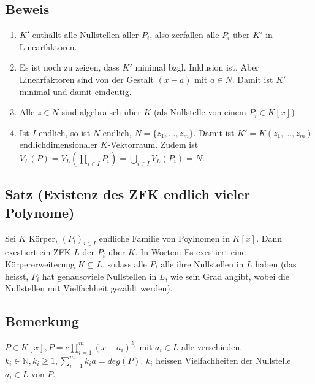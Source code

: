 \documentclass[12pt,a4paper,ngerman]{scrreprt}
\begin{document}
\subsection{Beweis}
\begin{enumerate}[(1)]
\item $K'$ enthällt alle Nullstellen aller $P_i$, also zerfallen alle $P_i$ über $K'$ in Linearfaktoren.
\item Es ist noch zu zeigen, dass $K'$ minimal bzgl. Inklusion ist. 
Aber Linearfaktoren sind von der Gestalt $(x-a)$ mit $a \in N$.
Damit ist $K'$ minimal und damit eindeutig.
\item Alle $z \in N$ sind algebraisch über $K$ (als Nullstelle von einem $P_i \in K[x]$)
\item Ist $I$ endlich, so ist $N$ endlich, $N = \{ z_1, ..., z_m\}$.
Damit ist $K' = K(z_1, ..., z_m)$ endlichdimensionaler $K$-Vektorraum.
Zudem ist $V_L(P) = V_L(\prod_{i \in I}{P_i}) = \bigcup_{i \in I} V_L(P_i) = N$.
\end{enumerate}

\subsection{Satz (Existenz des ZFK endlich vieler Polynome)}
Sei $K$ Körper, $(P_i)_{i \in I}$ endliche Familie von Poylnomen in $K[x]$.
Dann exestiert ein ZFK $L$ der $P_i$ über $K$.
In Worten: Es exestiert eine Körpererweiterung $K \subseteq L$,
sodass alle $P_i$ alle ihre Nullstellen in $L$ haben 
(das heisst, $P_i$ hat genausoviele Nullstellen in $L$, wie sein Grad angibt,
wobei die Nullstellen mit Vielfachheit gezählt werden).


\subsection{Bemerkung}
$P \in K[x], P = c \prod_{i=1}^{m}{(x-a_i)}^{k_i}$ mit $a_i \in L$
alle verschieden. $k_i \in \mathbb{N}, k_i \geq 1, \sum_{i=1}^{m}{k_i} a = deg(P)$.
$k_i$ heissen Vielfachheiten der Nullstelle $a_i \in L$ von $P$. 
\end{document}

